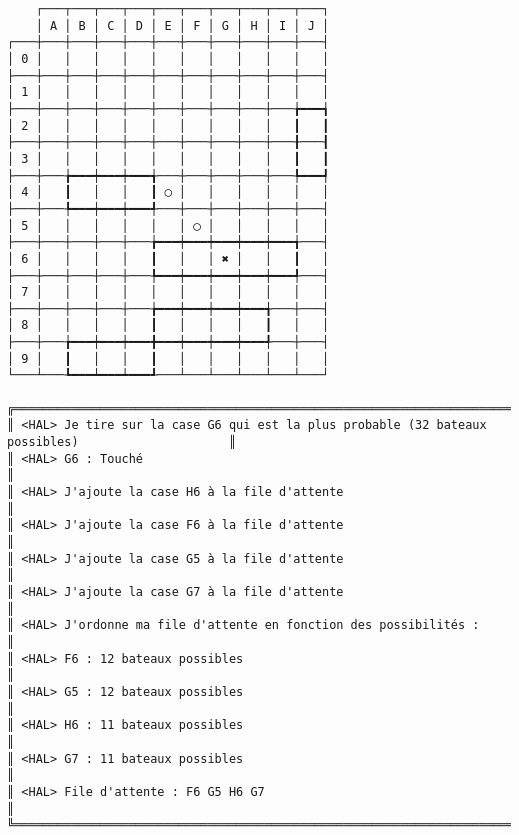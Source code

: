 {\scriptsize
\begin{verbatim}
    ┌───┬───┬───┬───┬───┬───┬───┬───┬───┬───┐
    │ A │ B │ C │ D │ E │ F │ G │ H │ I │ J │
┌───┼───┼───┼───┼───┼───┼───┼───┼───┼───┼───┤
│ 0 │   │   │   │   │   │   │   │   │   │   │
├───┼───┼───┼───┼───┼───┼───┼───┼───┼───┼───┤
│ 1 │   │   │   │   │   │   │   │   │   │   │
├───┼───┼───┼───┼───┼───┼───┼───┼───┼───╆━━━┪
│ 2 │   │   │   │   │   │   │   │   │   ┃   ┃
├───┼───┼───┼───┼───┼───┼───┼───┼───┼───╂───┨
│ 3 │   │   │   │   │   │   │   │   │   ┃   ┃
├───┼───╆━━━┿━━━┿━━━╅───┼───┼───┼───┼───╄━━━┩
│ 4 │   ┃   │   │   ┃ ◯ │   │   │   │   │   │
├───┼───╄━━━┿━━━┿━━━╃───┼───┼───┼───┼───┼───┤
│ 5 │   │   │   │   │   │ ◯ │   │   │   │   │
├───┼───┼───┼───┼───╆━━━┿━━━┿━━━┿━━━┿━━━╅───┤
│ 6 │   │   │   │   ┃   │   │ ✖ │   │   ┃   │
├───┼───┼───┼───┼───╄━━━┿━━━┿━━━┿━━━┿━━━╃───┤
│ 7 │   │   │   │   │   │   │   │   │   │   │
├───┼───┼───┼───┼───╆━━━┿━━━┿━━━┿━━━╅───┼───┤
│ 8 │   │   │   │   ┃   │   │   │   ┃   │   │
├───┼───╆━━━┿━━━┿━━━╋━━━┿━━━┿━━━┿━━━╃───┼───┤
│ 9 │   ┃   │   │   ┃   │   │   │   │   │   │
└───┴───┺━━━┷━━━┷━━━┹───┴───┴───┴───┴───┴───┘

╔══════════════════════════════════════════════════════════════════════════════════════════════════╗
║ <HAL> Je tire sur la case G6 qui est la plus probable (32 bateaux possibles)                     ║
║ <HAL> G6 : Touché                                                                                ║
║ <HAL> J'ajoute la case H6 à la file d'attente                                                    ║
║ <HAL> J'ajoute la case F6 à la file d'attente                                                    ║
║ <HAL> J'ajoute la case G5 à la file d'attente                                                    ║
║ <HAL> J'ajoute la case G7 à la file d'attente                                                    ║
║ <HAL> J'ordonne ma file d'attente en fonction des possibilités :                                 ║
║ <HAL> F6 : 12 bateaux possibles                                                                  ║
║ <HAL> G5 : 12 bateaux possibles                                                                  ║
║ <HAL> H6 : 11 bateaux possibles                                                                  ║
║ <HAL> G7 : 11 bateaux possibles                                                                  ║
║ <HAL> File d'attente : F6 G5 H6 G7                                                               ║
╚══════════════════════════════════════════════════════════════════════════════════════════════════╝
\end{verbatim}}
\newpage

